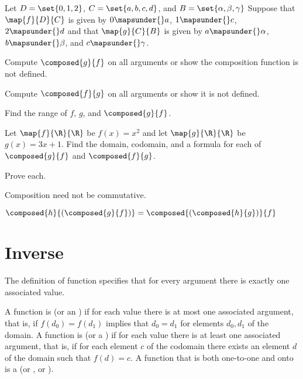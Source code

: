 \documentclass{ibl}
\begin{document}
\begin{ex} Let $D=\set{0,1,2}$, $C=\set{a,b,c,d}$, 
and $B=\set{\alpha,\beta,\gamma}$
Suppose that $\map{f}{D}{C}$ is given by $0\mapsunder{} a$, $1\mapsunder{} c$, 
$2\mapsunder{} d$ and that $\map{g}{C}{B}$
is given by 
$a\mapsunder{}\alpha$, $b\mapsunder{} \beta$, and $c\mapsunder{}\gamma$.
\begin{exes}
\item Compute $\composed{g}{f}$ on all arguments or show the composition
  function is not defined.
\item Compute $\composed{f}{g}$ on all arguments or show it is not defined.
\item Find the range of $f$, $g$, and $\composed{g}{f}$.    
\end{exes}
\end{ex}

\begin{ex}
Let $\map{f}{\R}{\R}$ be $f(x)=x^2$ and let $\map{g}{\R}{\R}$ be~$g(x)=3x+1$.
Find the domain, codomain, and a formula for each of
$\composed{g}{f}$ and $\composed{f}{g}$.  
\end{ex}

\begin{ex} Prove each.
\begin{exes}
\item Composition need not be commutative.
\item{} 
  $\composed{h}{(\composed{g}{f})}=\composed{(\composed{h}{g})}{f}$    
\end{exes}
\end{ex}





\section{Inverse}

The definition of function specifies that for every argument there is 
exactly one associated value.

\begin{df}
A function is  (or an ) 
if for each value there is at most
one associated argument, that is, if $f(d_0)=f(d_1)$ implies that $d_0=d_1$
for elements $d_0,d_1$ of the domain.
A function is  (or a ) 
if for each value there is at least
one associated argument, that is, if for each element $c$ of the codomain
there exists an element $d$ of the domain such that $f(d)=c$.
A function that is both one-to-one and onto is a 
 (or , or ).
\end{df}
\end{document}

